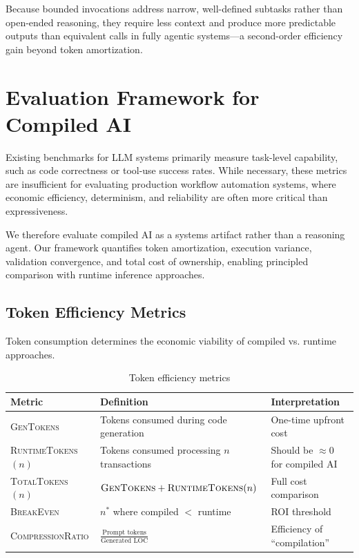 \documentclass[11pt]{article}
\newcommand{\metric}[1]{\textsc{#1}}
\begin{document}
Because bounded invocations address narrow, well-defined subtasks rather than open-ended reasoning, they require less context and produce more predictable outputs than equivalent calls in fully agentic systems—a second-order efficiency gain beyond token amortization.

\section{Evaluation Framework for Compiled AI}
\label{sec:framework}

Existing benchmarks for LLM systems primarily measure task-level capability, such as code correctness or tool-use success rates. While necessary, these metrics are insufficient for evaluating production workflow automation systems, where economic efficiency, determinism, and reliability are often more critical than expressiveness.

We therefore evaluate compiled AI as a systems artifact rather than a reasoning agent. Our framework quantifies token amortization, execution variance, validation convergence, and total cost of ownership, enabling principled comparison with runtime inference approaches.

\subsection{Token Efficiency Metrics}

Token consumption determines the economic viability of compiled vs. runtime approaches.

\begin{table}[ht]
\centering
\caption{Token efficiency metrics}
\label{tab:token-metrics}
\begin{tabular}{p{3.5cm}p{4cm}p{4.5cm}}
\toprule
Metric & Definition & Interpretation \\
\midrule
\metric{GenTokens} & Tokens consumed during code generation & One-time upfront cost \\
\metric{RuntimeTokens}$(n)$ & Tokens consumed processing $n$ transactions & Should be $\approx 0$ for compiled AI \\
\metric{TotalTokens}$(n)$ & $\text{\metric{GenTokens}} + \text{\metric{RuntimeTokens}}(n)$ & Full cost comparison \\
\metric{BreakEven} & $n^*$ where compiled $<$ runtime & ROI threshold \\
\metric{CompressionRatio} & $\frac{\text{Prompt tokens}}{\text{Generated LOC}}$ & Efficiency of ``compilation'' \\
\bottomrule
\end{tabular}
\end{table}
\end{document}
